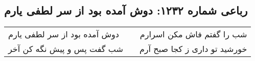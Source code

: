 \begin{center}
\section*{رباعی شماره ۱۲۳۲: دوش آمده بود از سر لطفی یارم}
\label{sec:1232}
\begin{longtable}{l p{0.5cm} r}
دوش آمده بود از سر لطفی یارم
&&
شب را گفتم فاش مکن اسرارم
\\
شب گفت پس و پیش نگه کن آخر
&&
خورشید تو داری ز کجا صبح آرم
\\
\end{longtable}
\end{center}
